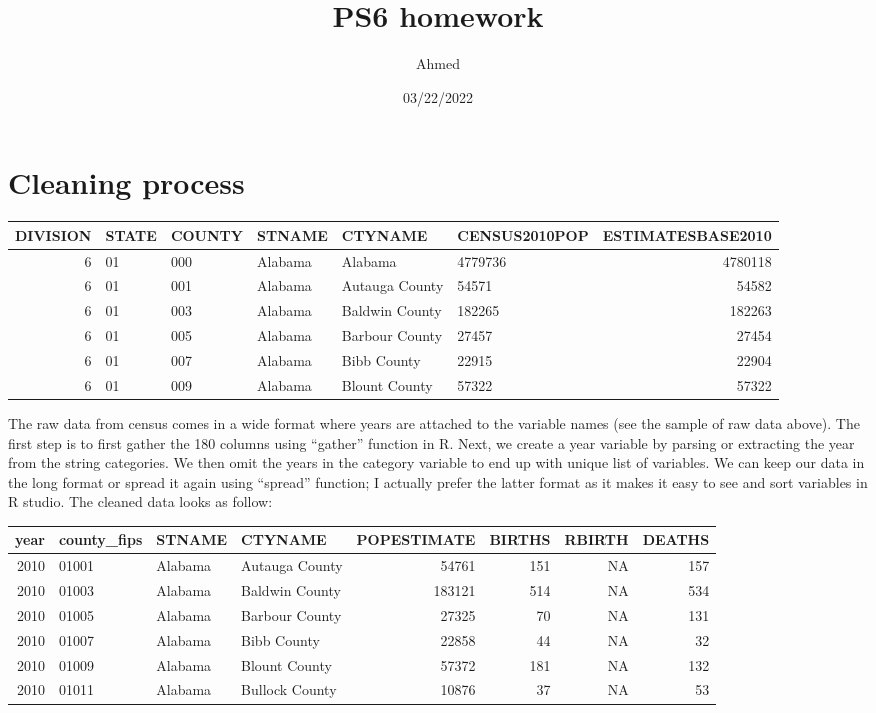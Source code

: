 \documentclass[
]{article}
\title{PS6 homework}
\author{Ahmed}
\date{03/22/2022}
\begin{document}
\maketitle

\hypertarget{cleaning-process}{%
\section{Cleaning process}\label{cleaning-process}}

\begin{tabular}{r|l|l|l|l|l|r}
\hline
DIVISION & STATE & COUNTY & STNAME & CTYNAME & CENSUS2010POP & ESTIMATESBASE2010\\
\hline
6 & 01 & 000 & Alabama & Alabama & 4779736 & 4780118\\
\hline
6 & 01 & 001 & Alabama & Autauga County & 54571 & 54582\\
\hline
6 & 01 & 003 & Alabama & Baldwin County & 182265 & 182263\\
\hline
6 & 01 & 005 & Alabama & Barbour County & 27457 & 27454\\
\hline
6 & 01 & 007 & Alabama & Bibb County & 22915 & 22904\\
\hline
6 & 01 & 009 & Alabama & Blount County & 57322 & 57322\\
\hline
\end{tabular}

The raw data from census comes in a wide format where years are attached
to the variable names (see the sample of raw data above). The first step
is to first gather the 180 columns using ``gather'' function in R. Next,
we create a year variable by parsing or extracting the year from the
string categories. We then omit the years in the category variable to
end up with unique list of variables. We can keep our data in the long
format or spread it again using ``spread'' function; I actually prefer
the latter format as it makes it easy to see and sort variables in R
studio. The cleaned data looks as follow:

\begin{tabular}{r|l|l|l|r|r|r|r}
\hline
year & county\_fips & STNAME & CTYNAME & POPESTIMATE & BIRTHS & RBIRTH & DEATHS\\
\hline
2010 & 01001 & Alabama & Autauga County & 54761 & 151 & NA & 157\\
\hline
2010 & 01003 & Alabama & Baldwin County & 183121 & 514 & NA & 534\\
\hline
2010 & 01005 & Alabama & Barbour County & 27325 & 70 & NA & 131\\
\hline
2010 & 01007 & Alabama & Bibb County & 22858 & 44 & NA & 32\\
\hline
2010 & 01009 & Alabama & Blount County & 57372 & 181 & NA & 132\\
\hline
2010 & 01011 & Alabama & Bullock County & 10876 & 37 & NA & 53\\
\hline
\end{tabular}
\end{document}
